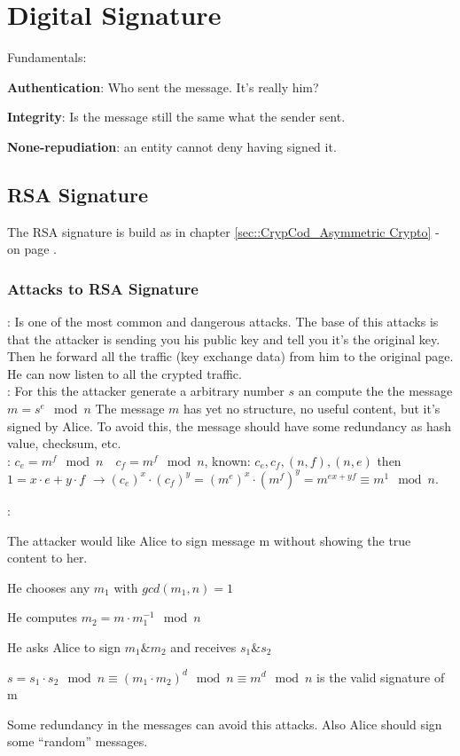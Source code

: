 
\section{Digital Signature}
Fundamentals:
\begin{liste}
  \item	\textbf{Authentication}: Who sent the message. It's really him?
  \item \textbf{Integrity}: Is the message still the same what the sender sent.
  \item \textbf{None-repudiation}: an entity cannot deny having signed it.
\end{liste}


\subsection{RSA  Signature}
The RSA signature is build as in chapter \ref{sec::CrypCod_Asymmetric Crypto} -  on page 
\pageref{sec::CrypCod_Asymmetric Crypto}.
\subsubsection{Attacks to RSA Signature}
: 
Is one of the most common and dangerous attacks. The base of this attacks is that the attacker is sending you his public key and 
tell you it's the original key. Then he forward all the traffic (key exchange data) from him to the original page. 
He can now listen to all the crypted traffic.\\
: For this the attacker generate a arbitrary number $s$ an compute the the message $m=s^e\mod n$
The message $m$ has yet no structure, no useful content, but it's signed by Alice. To avoid this, the message should have some redundancy as hash value,
checksum, etc.\\
: $c_e=m^f \mod n \quad c_f=m^f \mod n$, known: $c_e,c_f,(n,f),(n,e)$ then $1=x \cdot e + y \cdot f$
$\rightarrow (c_e)^x \cdot (c_f)^y=(m^e)^x \cdot (m^f)^y=m^{ex+yf} \equiv m^1 \mod n$.

: 
\begin{aufzaehlung}
\item The attacker would like Alice to sign message m without showing the true content to her.
\item He chooses any $m_1$ with $gcd(m_1,n)=1$
\item He computes $m_2 = m \cdot m_1^{-1} \mod n$
\item He asks Alice to sign $m_1 \& m_2$ and receives $s_1 \& s_2$
\item $s=s_1 \cdot s_2 \mod n \equiv (m_1\cdot m_2)^d \mod n \equiv m^d \mod n$ is the valid signature of m
\end{aufzaehlung}
Some redundancy in the messages can avoid this attacks. Also Alice should sign some ``random'' messages.

